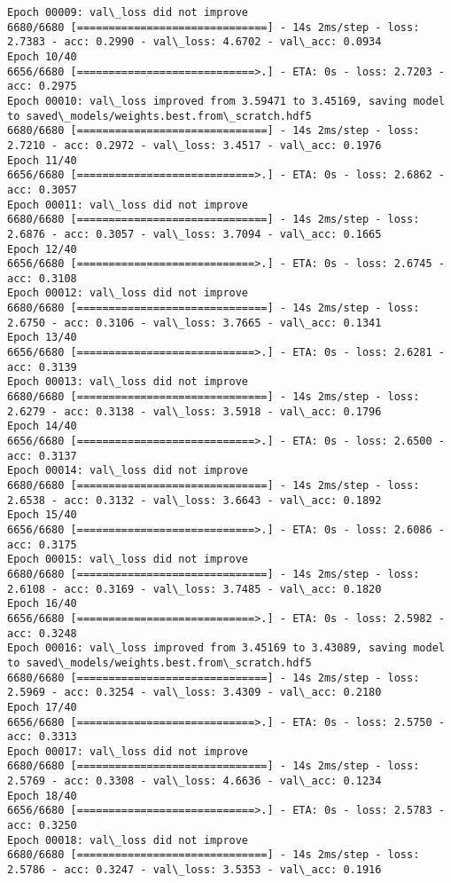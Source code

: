 \documentclass[11pt]{article}
\begin{document}
\begin{Verbatim}[commandchars=\\\{\}]
Epoch 00009: val\_loss did not improve
6680/6680 [==============================] - 14s 2ms/step - loss: 2.7383 - acc: 0.2990 - val\_loss: 4.6702 - val\_acc: 0.0934
Epoch 10/40
6656/6680 [============================>.] - ETA: 0s - loss: 2.7203 - acc: 0.2975
Epoch 00010: val\_loss improved from 3.59471 to 3.45169, saving model to saved\_models/weights.best.from\_scratch.hdf5
6680/6680 [==============================] - 14s 2ms/step - loss: 2.7210 - acc: 0.2972 - val\_loss: 3.4517 - val\_acc: 0.1976
Epoch 11/40
6656/6680 [============================>.] - ETA: 0s - loss: 2.6862 - acc: 0.3057
Epoch 00011: val\_loss did not improve
6680/6680 [==============================] - 14s 2ms/step - loss: 2.6876 - acc: 0.3057 - val\_loss: 3.7094 - val\_acc: 0.1665
Epoch 12/40
6656/6680 [============================>.] - ETA: 0s - loss: 2.6745 - acc: 0.3108
Epoch 00012: val\_loss did not improve
6680/6680 [==============================] - 14s 2ms/step - loss: 2.6750 - acc: 0.3106 - val\_loss: 3.7665 - val\_acc: 0.1341
Epoch 13/40
6656/6680 [============================>.] - ETA: 0s - loss: 2.6281 - acc: 0.3139
Epoch 00013: val\_loss did not improve
6680/6680 [==============================] - 14s 2ms/step - loss: 2.6279 - acc: 0.3138 - val\_loss: 3.5918 - val\_acc: 0.1796
Epoch 14/40
6656/6680 [============================>.] - ETA: 0s - loss: 2.6500 - acc: 0.3137
Epoch 00014: val\_loss did not improve
6680/6680 [==============================] - 14s 2ms/step - loss: 2.6538 - acc: 0.3132 - val\_loss: 3.6643 - val\_acc: 0.1892
Epoch 15/40
6656/6680 [============================>.] - ETA: 0s - loss: 2.6086 - acc: 0.3175
Epoch 00015: val\_loss did not improve
6680/6680 [==============================] - 14s 2ms/step - loss: 2.6108 - acc: 0.3169 - val\_loss: 3.7485 - val\_acc: 0.1820
Epoch 16/40
6656/6680 [============================>.] - ETA: 0s - loss: 2.5982 - acc: 0.3248
Epoch 00016: val\_loss improved from 3.45169 to 3.43089, saving model to saved\_models/weights.best.from\_scratch.hdf5
6680/6680 [==============================] - 14s 2ms/step - loss: 2.5969 - acc: 0.3254 - val\_loss: 3.4309 - val\_acc: 0.2180
Epoch 17/40
6656/6680 [============================>.] - ETA: 0s - loss: 2.5750 - acc: 0.3313
Epoch 00017: val\_loss did not improve
6680/6680 [==============================] - 14s 2ms/step - loss: 2.5769 - acc: 0.3308 - val\_loss: 4.6636 - val\_acc: 0.1234
Epoch 18/40
6656/6680 [============================>.] - ETA: 0s - loss: 2.5783 - acc: 0.3250
Epoch 00018: val\_loss did not improve
6680/6680 [==============================] - 14s 2ms/step - loss: 2.5786 - acc: 0.3247 - val\_loss: 3.5353 - val\_acc: 0.1916

\end{Verbatim}
\end{document}
